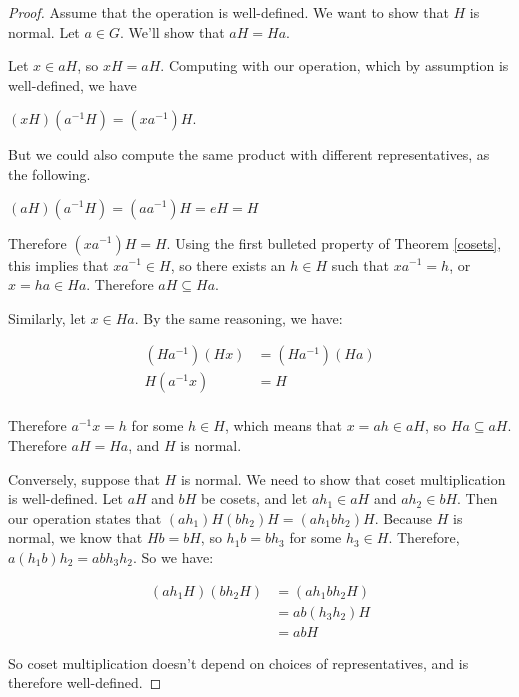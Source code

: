 \documentclass[12pt]{article}
\newcommand{\inv}[1]{#1^{-1}}
\theoremstyle{definition}
\theoremstyle{definition}
\theoremstyle{definition}
\theoremstyle{definition}
\begin{document}
\begin{proof}

Assume that the operation is well-defined. We want to show that $H$ is normal. Let $a \in G$. We'll show that $aH = Ha$.

Let $x \in aH$, so $xH = aH$. Computing with our operation, which by assumption is well-defined, we have

\begin{center}
    $(xH)(\inv a H) = (x\inv a)H$.
\end{center}

But we could also compute the same product with different representatives, as the following.

\begin{center}
    $(aH)(\inv a H) = (a \inv a)H = eH = H$
\end{center}

Therefore $(x\inv a)H = H$. Using the first bulleted property of Theorem \ref{cosets}, this implies that $x\inv a \in H$, so there exists an $h \in H$ such that $x\inv a = h$, or $x = ha \in Ha$. Therefore $aH \subseteq Ha$.

Similarly, let $x \in Ha$. By the same reasoning, we have:

\begin{align*}
    (H\inv a)(Hx) &= (H\inv a)(Ha) \\
    H(\inv a x) &= H \\
\end{align*}

Therefore $\inv a x = h$ for some $h \in H$, which means that $x = ah \in aH$, so $Ha \subseteq aH$. Therefore $aH = Ha$, and $H$ is normal.

Conversely, suppose that $H$ is normal. We need to show that coset multiplication is well-defined. Let $aH$ and $bH$ be cosets, and let $ah_1 \in aH$ and $ah_2 \in bH$. Then our operation states that $(ah_1)H(bh_2)H = (ah_1bh_2)H$. Because $H$ is normal, we know that $Hb = bH$, so $h_1 b = b h_3$ for some $h_3 \in H$. Therefore, $a\left(h_1b\right) h_2 = ab h_3 h_2$. So we have:

\begin{align*}
    \left(ah_1 H\right)\left(bh_2 H\right) &= \left(ah_1bh_2 H\right) \\
    &= ab\left(h_3 h_2\right)H \\
    &= ab H
\end{align*}

So coset multiplication doesn't depend on choices of representatives, and is therefore well-defined.

\end{proof}
\end{document}

